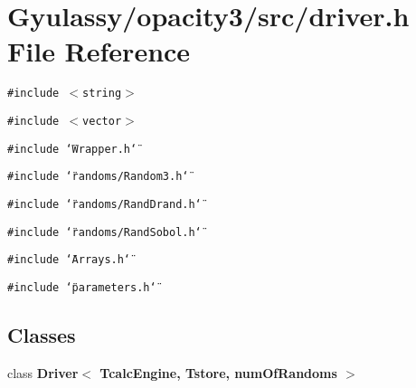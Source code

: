 \section{Gyulassy/opacity3/src/driver.h File Reference}
\label{driver_8h}
{\tt \#include $<$string$>$}\par
{\tt \#include $<$vector$>$}\par
{\tt \#include \char`\"{}Wrapper.h\char`\"{}}\par
{\tt \#include \char`\"{}randoms/Random3.h\char`\"{}}\par
{\tt \#include \char`\"{}randoms/RandDrand.h\char`\"{}}\par
{\tt \#include \char`\"{}randoms/RandSobol.h\char`\"{}}\par
{\tt \#include \char`\"{}Arrays.h\char`\"{}}\par
{\tt \#include \char`\"{}parameters.h\char`\"{}}\par
\subsection*{Classes}
\begin{CompactItemize}
\item 
class {\bf Driver$<$ TcalcEngine, Tstore, numOfRandoms $>$}
\end{CompactItemize}
